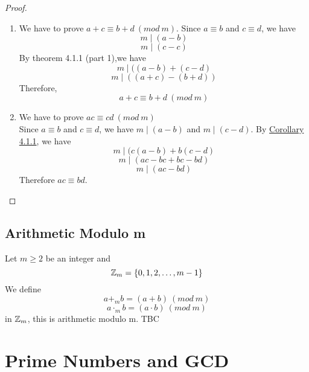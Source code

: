 \documentclass[openany]{report}
\begin{document}
    \begin{proof}
    \begin{enumerate}
        \item We have to prove $a + c \equiv b + d \ (mod \ m)$. Since $a \equiv b$ and $c \equiv d$, we have 
        $$m \mid (a - b)$$
        $$m \mid (c - c)$$
        By theorem 4.1.1 (part 1),we have 
        $$m \mid ((a-b) + (c -d)$$
        $$m \mid ((a+c) - (b + d))$$
        Therefore,
        $$a + c \equiv b + d \ (mod \ m)$$
        \item We have to prove $ac \equiv cd \ (mod \ m)$\\[1ex]
        Since $a \equiv b$ and $c \equiv d$, we have $m \mid (a-b)$ and $m \mid (c -d)$. By \hyperref[corollary4.1.1]{Corollary 4.1.1}, we have 
        $$m \mid (c(a-b)+b(c-d)$$
        $$m \mid (ac - bc + bc- bd)$$
        $$m \mid (ac - bd)$$
        Therefore $ac \equiv bd$.
    \end{enumerate}
    \end{proof}

    \section{Arithmetic Modulo m}
    Let $m \geq 2$ be an integer and 
    $$\mathbb{Z}_m = \{0,1,2,\dots, m-1\}$$
    We define 
    $$a +_m b = (a + b) \ (mod \ m)$$
    $$a \cdot_m b = (a \cdot b) \ (mod \ m)$$
    in $\mathbb{Z}_m$, this is arithmetic modulo m.
    TBC


\chapter{Prime Numbers and GCD}
\end{document}
